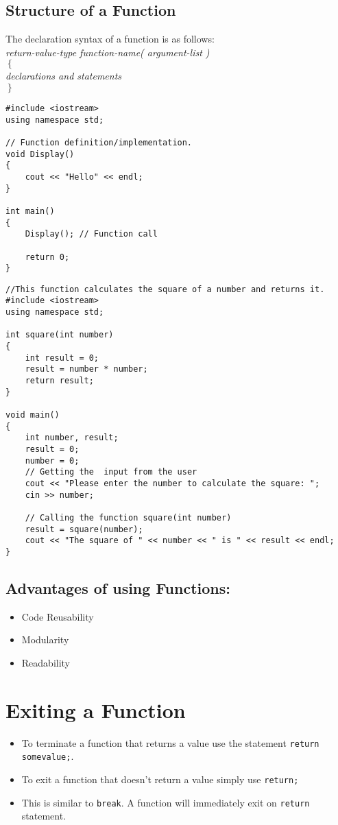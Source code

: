 \documentclass[12pt,a4paper]{article}
\begin{document}
\subsection{Structure of a Function}
The declaration syntax of a function is as follows:\\[0.3cm]
\textit{return-value-type    function-name( argument-list )\\
$\left\lbrace\right.$\\
\hspace{1cm}declarations and statements\\
$\left.\right\rbrace$}
\begin{lstlisting}
#include <iostream>
using namespace std;

// Function definition/implementation.
void Display()
{
	cout << "Hello" << endl;
}

int main()
{
	Display(); // Function call	
	
	return 0;
}
\end{lstlisting}
\begin{lstlisting}
//This function calculates the square of a number and returns it.
#include <iostream>
using namespace std;

int square(int number)
{
    int result = 0;
    result = number * number;
    return result;
}

void main()
{
    int number, result;
    result = 0;
    number = 0;
    // Getting the  input from the user
    cout << "Please enter the number to calculate the square: ";
    cin >> number;

    // Calling the function square(int number)
    result = square(number);
    cout << "The square of " << number << " is " << result << endl;
}
\end{lstlisting}
\subsection{Advantages of using Functions:}
\begin{itemize}
\item Code Reusability
\item Modularity
\item Readability
\end{itemize}
\section{Exiting a Function}
\begin{itemize}
\item To terminate a function that returns a value use the statement \verb|return somevalue;|.
\item To exit a function that doesn't return a value simply use \verb|return;|
\item This is similar to \verb|break|. A function will immediately exit on \verb|return| statement.
\end{itemize}
\end{document}
